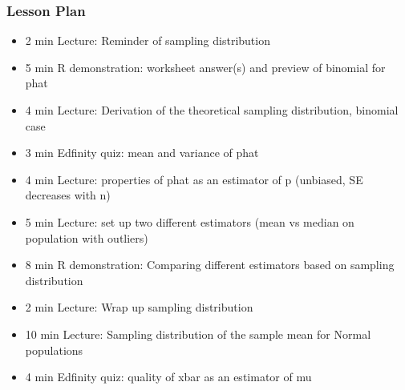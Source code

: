 

\begin{frame}
\frametitle{Lesson Plan}
\begin{itemize}
    \item 2 min Lecture: Reminder of sampling distribution
    \item 5 min R demonstration: worksheet answer(s) and preview of binomial for phat
    \item 4 min Lecture: Derivation of the theoretical sampling distribution, binomial case
    \item 3 min Edfinity quiz: mean and variance of phat
    \item 4 min Lecture: properties of phat as an estimator of p (unbiased, SE decreases with n)
    \item 5 min Lecture: set up two different estimators (mean vs median on population with outliers) 
    \item 8 min R demonstration: Comparing different estimators based on sampling distribution 
    \item 2 min Lecture: Wrap up sampling distribution

    \item 10 min Lecture: Sampling distribution of the sample mean for Normal populations 
    \item 4 min Edfinity quiz: quality of xbar as an estimator of mu
    
 \end{itemize}
\end{frame}
    

